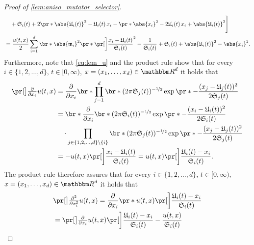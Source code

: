 \begin{proof}[Proof of \cref{lem:aniso_mutator_selector}]
\begin{align}
		\nonumber
		&\quad + \mathfrak{S}_i(t) + 2\pr*{\abs{\mathfrak{U}_i(t)}^2 - \mathfrak{U}_i(t)\, x_i} - \pr*{\abs{x_i}^2 -2 \mathfrak{U}_i(t) \, x_i + \abs{\mathfrak{U}_i(t)}^2 }  \Biggr] 
		\\ &= 
		\nonumber
		\frac{u(t,x)}{2} \sum_{i=1}^d \br*{  \abs{\mathfrak{m}_i}^2  \pr*{ \bbbpr{\frac{x_i - \mathfrak{U}_i(t)}{\mathfrak{S}_i(t)}}^{2} - \frac{1}{\mathfrak{S}_i(t)} } + \mathfrak{S}_i(t) + \abs{\mathfrak{U}_i(t)}^2 - \abs{x_i}^2 }
		.
	\end{align}
	Furthermore, note that 
		\eqref{eq:lem_u} 
		and the product rule 
	show that 
		for every
			$i \in \{1,2, \dots,d\}$,
			$t \in [0,\infty)$,
			$x = (x_1, \dots,x_d)\in \R^d$
		it holds that 
		\begin{equation}
		\begin{split}
			\bpr{ \tfrac{\partial }{\partial x_i} u}(t,x)
			&=  
			\frac{\partial }{\partial x_i}  
			\br*{\prod_{j = 1}^d\br*{(2\pi   \mathfrak{S}_j(t))^{-\nicefrac{1}{2}}   \exp\pr*{ - \frac{(x_j -\mathfrak{U}_j(t) )^2}{2\mathfrak{S}_j(t)}} } }
			\\ &= 
			\br*{ \frac{\partial }{\partial x_i} 
				\br*{(2\pi   \mathfrak{S}_i(t))^{-\nicefrac{1}{2}}   \exp\pr*{ - \frac{(x_i -\mathfrak{U}_i(t) )^2}{2\mathfrak{S}_i(t)} } } }\\
				&\quad \cdot \prod_{ j \in \{ 1,2, \dots,d \} \backslash\{i\}} \br*{ (2\pi   \mathfrak{S}_j(t))^{-\nicefrac{1}{2}}   \exp\pr*{ - \frac{(x_j -\mathfrak{U}_j(t) )^2}{2\mathfrak{S}_j(t)} } }
			\\ &= 
			- u(t,x) \bbbpr{ \frac{x_i - \mathfrak{U}_i(t)}{\mathfrak{S}_i(t)} } = u(t,x) \bbbpr{ \frac{\mathfrak{U}_i(t) - x_i }{\mathfrak{S}_i(t)} }
			.
		\end{split}
		\end{equation}
		The product rule 
		therefore 
	assures that 
		for every
			$i \in \{1,2, \dots,d\}$,
			$t \in [0,\infty)$,
			$x = (x_1, \dots,x_d)\in \R^d$
		it holds that 
		\begin{equation}
		\begin{split}
			&
			\bpr{ \tfrac{\partial^2 }{\partial x_i^2} u }(t,x) 
			= 
			\frac{\partial }{\partial x_i} \pr*{u(t,x) \bbbpr{ \frac{ \mathfrak{U}_i(t) - x_i}{\mathfrak{S}_i(t)} }}
			\\ &=
			\bpr{\tfrac{\partial}{\partial x_i} u}(t,x)\bbbpr{ \frac{\mathfrak{U}_i(t) - x_i }{\mathfrak{S}_i(t)} } - \frac{u(t,x)}{\mathfrak S_i(t)}

\end{split}
\end{equation}
\end{proof}
